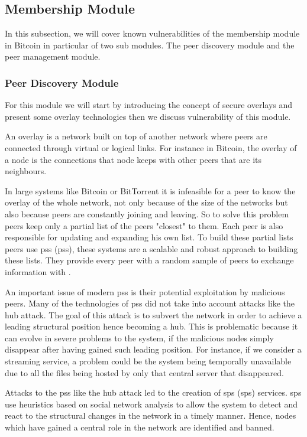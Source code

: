 \subsection{Membership Module}
\label{sec:m_module}
In this subsection, we will cover known vulnerabilities of the membership module in Bitcoin in particular of two sub modules. The peer discovery module and the peer management module.


\subsubsection{Peer Discovery Module}
\label{sec:peer_disc_module}
For this module we will start by introducing the concept of secure overlays and present some overlay technologies then we discuss vulnerability of this module.

An overlay is a network built on top of another network where peers are connected through virtual or logical links. For instance in Bitcoin, the overlay of a node is the connections that node keeps with other peers that are its neighbours.

In large systems like Bitcoin or BitTorrent it is infeasible for a peer to know the overlay of the whole network, not only because of the size of the networks but also because peers are constantly joining and leaving. So to solve this problem peers keep only a partial list of the peers "closest" to them. Each peer is also responsible for updating and expanding his own list. To build these partial lists peers use \acrlong{pss} (\acrshort{pss}), these systems are a scalable and robust approach to building these lists. They provide every peer with a random sample of peers to exchange information with \cite{jelasity2004peer}.

An important issue of modern \acrshort{pss} is their potential exploitation by malicious peers. Many of the technologies of \acrshort{pss} did not take into account attacks like the hub attack. The goal of this attack is to subvert the network in order to achieve a leading structural position hence becoming a hub. This is problematic because it can evolve in severe problems to the system, if the malicious nodes simply disappear after having gained such leading position. For instance, if we consider a streaming service, a problem could be the system being temporally unavailable due to all the files being hosted by only that central server that disappeared.

Attacks to the \acrshort{pss} like the hub attack led to the creation of \acrlong{sps} (\acrshort{sps}) services. \acrshort{sps} use heuristics based on social network analysis to allow the system to detect and react to the structural changes in the network in a timely manner. Hence, nodes which have gained a central role in the network are identified and banned.

